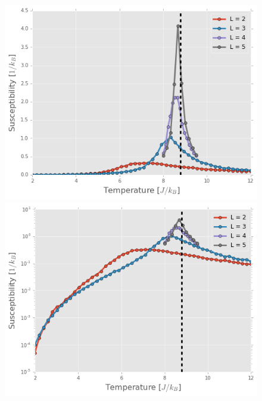 \documentclass[11pt, oneside]{article}
\begin{document}
\begin{figure}[H]
    \vspace*{0cm} %

    \begin{minipage}{0.47\textwidth}
    \includegraphics[width=\linewidth]{img/5D/susc_lin}
    \end{minipage}
    \hspace{\fill} %
    \begin{minipage}{0.47\textwidth}
    \includegraphics[width=\linewidth]{img/5D/susc}
    \end{minipage}

    \vspace*{0cm} %


\end{figure}
\end{document}
